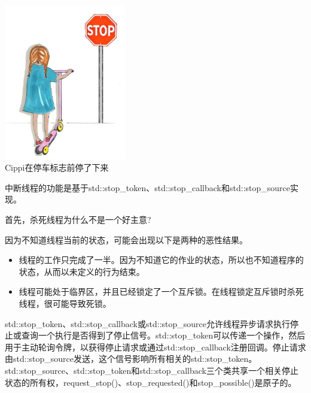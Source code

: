 \begin{center}
\includegraphics[width=0.4\textwidth]{content/3/chapter6/images/22.png}\\
Cippi在停车标志前停了下来
\end{center}

中断线程的功能是基于std::stop\_token、std::stop\_callback和std::stop\_source实现。

首先，杀死线程为什么不是一个好主意?

\begin{tcolorbox}[breakable,enhanced jigsaw,colback=red!5!white,colframe=red!75!black,title={杀死线程很危险}]
	
因为不知道线程当前的状态，可能会出现以下是两种的恶性结果。

\begin{itemize}
\item 
线程的工作只完成了一半。因为不知道它的作业的状态，所以也不知道程序的状态，从而以未定义的行为结束。

\item 
线程可能处于临界区，并且已经锁定了一个互斥锁。在线程锁定互斥锁时杀死线程，很可能导致死锁。
\end{itemize}
\end{tcolorbox}


std::stop\_token、std::stop\_callback或std::stop\_source允许线程异步请求执行停止或查询一个执行是否得到了停止信号。std::stop\_token可以传递一个操作，然后用于主动轮询令牌，以获得停止请求或通过std::stop\_callback注册回调。停止请求由std::stop\_source发送，这个信号影响所有相关的std::stop\_token。std::stop\_source、std::stop\_token和std::stop\_callback三个类共享一个相关停止状态的所有权，request\_stop()、stop\_requested()和stop\_possible()是原子的。

